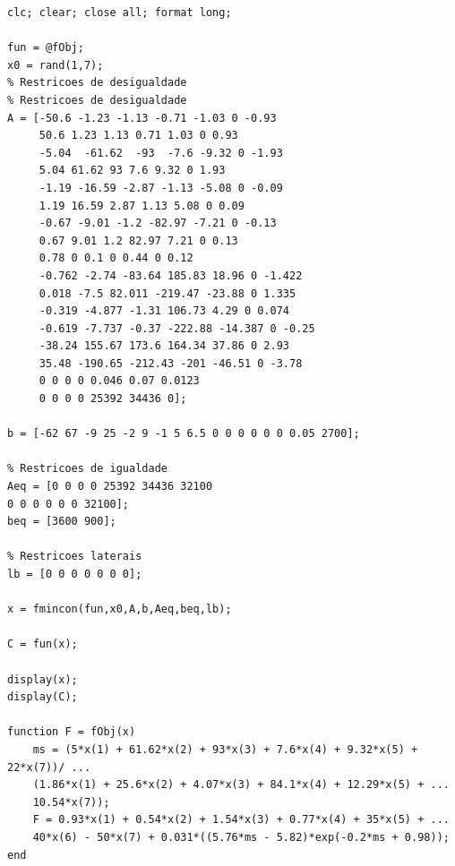 \documentclass[12pt]{article}
\begin{document}
 	\begin{lstlisting}
clc; clear; close all; format long; 

fun = @fObj;
x0 = rand(1,7);
% Restricoes de desigualdade
% Restricoes de desigualdade
A = [-50.6 -1.23 -1.13 -0.71 -1.03 0 -0.93 
     50.6 1.23 1.13 0.71 1.03 0 0.93
     -5.04  -61.62  -93  -7.6 -9.32 0 -1.93
     5.04 61.62 93 7.6 9.32 0 1.93 
     -1.19 -16.59 -2.87 -1.13 -5.08 0 -0.09
     1.19 16.59 2.87 1.13 5.08 0 0.09
     -0.67 -9.01 -1.2 -82.97 -7.21 0 -0.13 
     0.67 9.01 1.2 82.97 7.21 0 0.13
     0.78 0 0.1 0 0.44 0 0.12 
     -0.762 -2.74 -83.64 185.83 18.96 0 -1.422
     0.018 -7.5 82.011 -219.47 -23.88 0 1.335
     -0.319 -4.877 -1.31 106.73 4.29 0 0.074
     -0.619 -7.737 -0.37 -222.88 -14.387 0 -0.25
     -38.24 155.67 173.6 164.34 37.86 0 2.93
     35.48 -190.65 -212.43 -201 -46.51 0 -3.78
     0 0 0 0 0.046 0.07 0.0123
     0 0 0 0 25392 34436 0];

b = [-62 67 -9 25 -2 9 -1 5 6.5 0 0 0 0 0 0 0.05 2700];

% Restricoes de igualdade
Aeq = [0 0 0 0 25392 34436 32100
0 0 0 0 0 0 32100];
beq = [3600 900];

% Restricoes laterais
lb = [0 0 0 0 0 0 0];

x = fmincon(fun,x0,A,b,Aeq,beq,lb);

C = fun(x);

display(x);
display(C);

function F = fObj(x)
	ms = (5*x(1) + 61.62*x(2) + 93*x(3) + 7.6*x(4) + 9.32*x(5) + 22*x(7))/ ...
	(1.86*x(1) + 25.6*x(2) + 4.07*x(3) + 84.1*x(4) + 12.29*x(5) + ...
	10.54*x(7));
	F = 0.93*x(1) + 0.54*x(2) + 1.54*x(3) + 0.77*x(4) + 35*x(5) + ...
	40*x(6) - 50*x(7) + 0.031*((5.76*ms - 5.82)*exp(-0.2*ms + 0.98));
end
 	\end{lstlisting}
 
\end{document}
